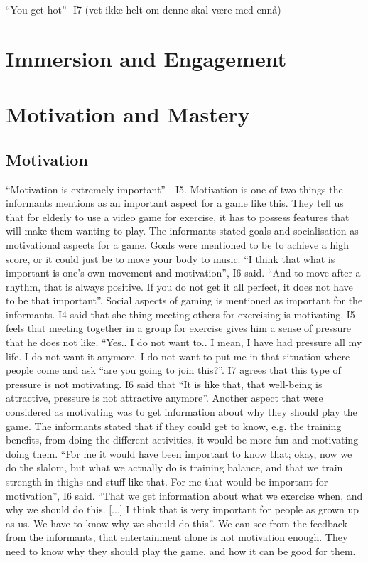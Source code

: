 “You get hot” -I7
 (vet ikke helt om denne skal være med ennå)

\section{Immersion and Engagement}

\section{Motivation and Mastery}
\subsection{Motivation}
“Motivation is extremely important” - I5. Motivation is one of two things the informants mentions as an important aspect for a game like this. They tell us that for elderly to use a video game for exercise, it has to possess features that will make them wanting to play. The informants stated goals and socialisation as motivational aspects for a game. Goals were mentioned to be to achieve a high score, or it could just be to move your body to music. “I think that what is important is one’s own movement and motivation”, I6 said. “And to move after a rhythm, that is always positive. If you do not get it all perfect, it does not have to be that important”. Social aspects of gaming is mentioned as important for the informants. I4 said that she thing meeting others for exercising is motivating. I5 feels that meeting together in a group for exercise gives him a sense of pressure that he does not like. “Yes.. I do not want to.. I mean, I have had pressure all my life. I do not want it anymore. I do not want to put me in that situation where people come and ask “are you going to join this?”. I7 agrees that this type of pressure is not motivating. I6 said that “It is like that, that well-being is attractive, pressure is not attractive anymore”.  Another aspect that were considered as motivating was to get information about why they should play the game. The informants stated that if they could get to know, e.g. the training benefits, from doing the different activities, it would be more fun and motivating doing them. “For me it would have been important to know that; okay, now we do the slalom, but what we actually do is training balance, and that we train strength in thighs and stuff like that. For me that would be important for motivation”, I6 said. “That we get information about what we exercise when, and why we should do this. [...] I think that is very important for people as grown up as us. We have to know why we should do this”. We can see from the feedback from the informants, that entertainment alone is not motivation enough. They need to know why they should play the game, and how it can be good for them. 

